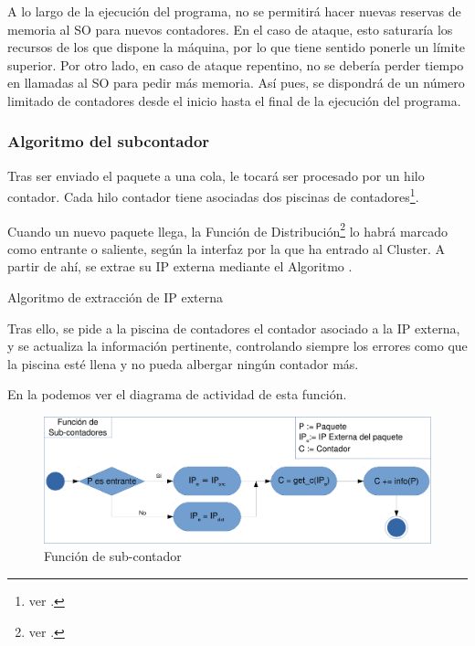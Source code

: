 A lo largo de la ejecución del programa, no se permitirá hacer nuevas reservas de memoria al \gls{SO} para 
nuevos contadores. En el caso de ataque, esto saturaría los recursos de los que dispone la máquina, por lo que tiene 
sentido ponerle un límite superior. Por otro lado, en caso de ataque repentino, no se debería perder tiempo en llamadas 
al \gls{SO} para pedir más memoria. Así pues, se dispondrá de un número limitado de contadores desde el inicio hasta el 
final de la ejecución del programa.

\subsubsection{Algoritmo del subcontador}
Tras ser enviado el paquete a una cola, le tocará ser procesado por un hilo contador. Cada hilo contador tiene 
asociadas dos piscinas de contadores\footnote{ver .}. 

Cuando un nuevo paquete llega, la Función de Distribución\footnote{ver .} lo habrá marcado como 
entrante o saliente, según la interfaz por la que ha entrado al Cluster. A partir de ahí, se extrae su \gls{IP} externa 
mediante el Algoritmo .

\begin{algorithm}[htbp]
 \caption{Algoritmo de extracción de IP externa}
\end{algorithm}

Tras ello, se pide a la piscina de contadores el contador asociado a la IP externa, y se actualiza la información 
pertinente, controlando siempre los errores como que la piscina esté llena y no pueda albergar ningún contador más.

En la  podemos ver el diagrama de actividad de esta función.

\begin{figure}[htbp]
\centering
\includegraphics[width=\textwidth]{CapituloEstructura/Figuras/ActividadFuncionContador-crop}
\caption{Función de sub-contador}
\end{figure}
%

